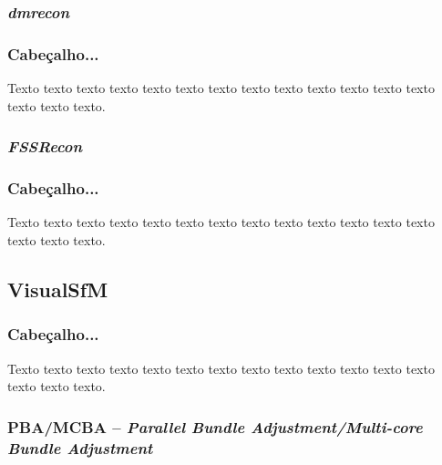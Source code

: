 \documentclass[table, usenames, svgnames, dvipsnames]{beamer}
\begin{document}
\subsubsection{\emph{dmrecon}}

\begin{frame} 
\frametitle{\textbf{Cabeçalho...}}
	\begin{center}
		Texto texto texto texto texto texto texto texto texto texto texto texto texto
		texto texto texto.
	\end{center}
\end{frame}

\subsubsection{\emph{FSSRecon}}

\begin{frame} 
\frametitle{\textbf{Cabeçalho...}}
	\begin{center}
		Texto texto texto texto texto texto texto texto texto texto texto texto texto
		texto texto texto.
	\end{center}
\end{frame}


\subsection{VisualSfM}

\begin{frame} 
\frametitle{\textbf{Cabeçalho...}}
	\begin{center}
		Texto texto texto texto texto texto texto texto texto texto texto texto texto
		texto texto texto.
	\end{center}
\end{frame}

\subsubsection{PBA/MCBA -- \emph{Parallel Bundle Adjustment/Multi-core Bundle Adjustment}}
\end{document}
